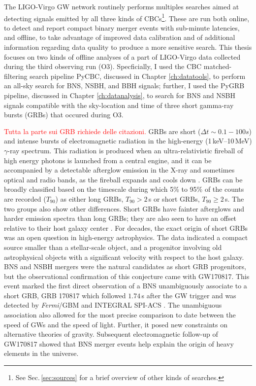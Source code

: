 \documentclass[binding=0.6cm, LaM]{sapthesis}
\newcommand{\fpg}[1]{\textcolor{red}{#1} }
\begin{document}
	The LIGO-Virgo GW network routinely performs multiples searches aimed at detecting signals 
	emitted by all three kinds of CBCs\footnote{See Sec.\,\ref{sec:sources} for a brief overview of other kinds of searches.}.
        These are run both online, to detect and report compact binary merger events 
	with sub-minute latencies, and offline, to take advantage of improved data calibration 	
	and of additional information regarding data quality to produce a more sensitive search.
	This thesis focuses on two kinds of offline analyses of a part of LIGO-Virgo data collected during the third observing run (O3).
        Specficially, I used the CBC matched-filtering search pipeline {\ttfamily PyCBC}, discussed in Chapter \ref{ch:datatools}, 
	to perform an all-sky search for BNS, NSBH, and BBH signals; further, I used the {\ttfamily PyGRB} pipeline, 
	discussed in Chapter \ref{ch:datanalysis}, to search for BNS and NSBH signals compatible 
	with the sky-location and time of three short gamma-ray bursts (GRBs) that occured during O3.

        \fpg{Tutta la parte sui GRB richiede delle citazioni.}
	GRBs are short ($\Delta t \sim 0.1-100s$) and intense bursts of 
	electromagnetic radiation in the high-energy (1\,keV--10\,MeV) $\gamma$-ray spectrum.
	This radiation is produced when an ultra-relativistic fireball of high energy photons 
	is launched from a central engine, and it can be accompanied by a detectable afterglow emission 
	in the X-ray and sometimes optical and radio bands, as the fireball expands and cools down \cite{139}.
	GRBs can be broadly classified based on the timescale during which 5\% to 95\% of the counts are recorded ($T_{90}$)
	as either long GRBs, $T_{90} > 2\,$s or short GRBs, $T_{90} \geq 2\,$s.
	The two groups also show other differences.  
	Short GRBs have fainter afterglows and harder emission spectra than long GRBs; 
	they are also seen to have an offset relative to their host galaxy center \cite{162}.
	For decades, the exact origin of short GRBs was an open question in high-energy astrophysics.  
	The data indicated a compact source smaller than a stellar-scale object, 
	and a progenitor involving old astrophysical objects with a significant velocity with respect to the host galaxy.  
	BNS and NSBH mergers were the natural candidates as short GRB progenitors, 
	but the observational confirmation of this conjecture came with GW170817.
	This event marked the first direct observation of a BNS unambiguously associate to a short GRB, 
	GRB 170817 which followed $1.74\,$s after the GW trigger and was detected by {\it Fermi}/GBM and INTEGRAL SPI-ACS \cite{15}.
	The unambiguous association also allowed for the most precise comparison to date
	between the speed of GWs and the speed of light.  
	Further, it posed new constraints on alternative theories of gravity. 
	Subsequent electromagnetic follow-up of GW170817 showed that BNS merger events 
	help explain the origin of heavy elements in the universe.
\end{document}
